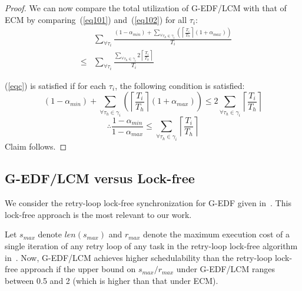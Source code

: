 \begin{proof}
We can now compare the total utilization of G-EDF/LCM with that of ECM by comparing~(\ref{eq101}) and~(\ref{eq102}) for all $\tau_i$:
\begin{eqnarray}
& & \sum_{\forall \tau_{i}}\frac{(1-\alpha_{min})+\sum_{\forall \tau_{h}\in\gamma_{i}}\left(\left\lceil\frac{T_{i}}{T_{h}}\right\rceil(1+\alpha_{max})\right)}{T_{i}} \nonumber\\
& \le &   \sum_{\forall \tau_{i}}\frac{\sum_{\forall \tau_{h}\in\gamma_{i}}2\left\lceil\frac{T_{i}}{T_{h}}\right\rceil}{T_{i}}\label{eqc}\end{eqnarray}

(\ref{eqc}) is satisfied if for each $\tau_{i}$, the following condition is satisfied:
\begin{equation*}
(1-\alpha_{min})+\sum_{\forall \tau_h \in \gamma_i}\left(\left\lceil\frac{T_{i}}{T_{h}}\right\rceil(1+\alpha_{max})\right)  \le  2\sum_{\forall \tau_h \in \gamma_i}\left\lceil\frac{T_{i}}{T_{h}}\right\rceil
\end{equation*}
\begin{equation*}
\therefore\frac{1-\alpha_{min}}{1-\alpha_{max}}  \le  \sum_{\forall \tau_h \in \gamma_i}\left\lceil\frac{T_{i}}{T_{h}}\right\rceil
\end{equation*}
Claim follows.
\end{proof}


\subsection{G-EDF/LCM versus Lock-free}
\label{gedf-lcm-lock-free}
We consider the retry-loop lock-free synchronization for G-EDF given in~\cite{key-5}. This lock-free approach is the most relevant to our work. 

\begin{clm}\label{gedf-lcm-lock-free_clm} 
Let $s_{max}$ denote $len(s_{max})$ and $r_{max}$ denote the maximum execution cost of a single iteration of any retry loop of any task in the retry-loop lock-free algorithm in~\cite{key-5}. Now, G-EDF/LCM achieves higher schedulability than the retry-loop lock-free approach if the upper bound on $s_{max}/r_{max}$ under G-EDF/LCM ranges between 0.5 and 2 (which is higher than that under  ECM). 
\end{clm}

